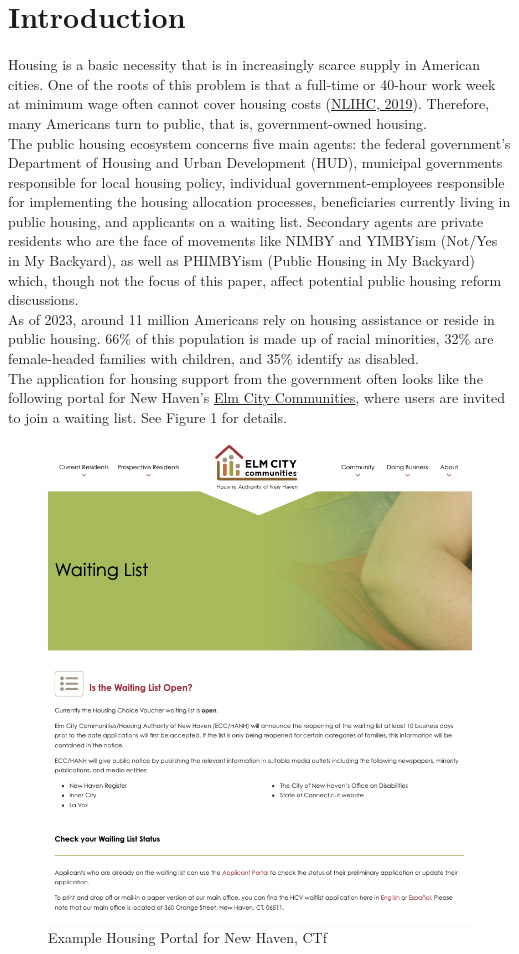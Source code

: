 \documentclass[11pt]{article}
\begin{document}
\section{Introduction}
Housing is a basic necessity that is in increasingly scarce supply in American cities. One of the roots of this problem is that a full-time or 40-hour work week at minimum wage often cannot cover housing costs (\href{https://reports.nlihc.org/oor/connecticut}{NLIHC, 2019}). Therefore, many Americans turn to public, that is, government-owned housing. \\
\newline
The public housing ecosystem concerns five main agents: the federal government’s Department of Housing and Urban Development (HUD), municipal governments responsible for local housing policy, individual government-employees  responsible for implementing the housing allocation processes, beneficiaries currently living in public housing, and applicants on a waiting list. Secondary agents are private residents who are the face of movements like NIMBY and YIMBYism (Not/Yes in My Backyard), as well as PHIMBYism (Public Housing in My Backyard) which, though not the focus of this paper, affect potential public housing reform discussions. \\
\newline
As of 2023, around 11 million Americans rely on housing assistance or reside in public housing. 66\% of this population is made up of racial minorities, 32\% are female-headed families with children, and 35\% identify as disabled. \\
\newline
The application for housing support from the government often looks like the following portal for New Haven’s \href{https://elmcitycommunities.org/waiting-list/}{Elm City Communities}, where users are invited to join a waiting list. See Figure 1 for details.
\newline
\begin{figure}
    \centering
    \includegraphics[width=0.75\linewidth]{elm.png}
    \caption{Example Housing Portal for New Haven, CTf}
\end{figure}
\end{document}
